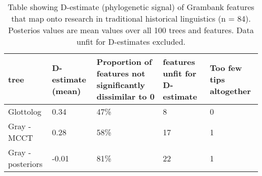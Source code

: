 \begin{table}[ht]
\centering
\begin{tabular}{p{2cm}p{2.2cm}p{4cm}p{2.5cm}p{2cm}}
  \hline
tree & D-estimate (mean) & Proportion of features not significantly dissimilar to 0 & features unfit for D-estimate & Too few tips altogether \\ 
  \hline
Glottolog & 0.34 & 47\% & 8 & 0 \\ 
  Gray - MCCT & 0.28 & 58\% & 17 & 1 \\ 
  Gray - posteriors & -0.01 & 81\% & 22 & 1 \\ 
   \hline
\end{tabular}
\caption{Table showing D-estimate (phylogenetic signal) of Grambank features that map onto research in traditional historical linguistics (n = 84). Posterios values are mean values over all 100 trees and features. Data unfit for D-estimates excluded.} 
\label{d_estimate_summary}
\end{table}
